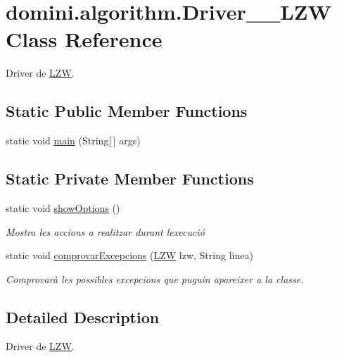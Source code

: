 \hypertarget{classdomini_1_1algorithm_1_1Driver____LZW}{}\section{domini.\+algorithm.\+Driver\+\_\+\+\_\+\+L\+ZW Class Reference}
\label{classdomini_1_1algorithm_1_1Driver____LZW}


Driver de \hyperlink{classdomini_1_1algorithm_1_1LZW}{L\+ZW}.  


\subsection*{Static Public Member Functions}
\begin{DoxyCompactItemize}
\item 
static void \hyperlink{classdomini_1_1algorithm_1_1Driver____LZW_a1500b5c33b09cbaad4645f6d87eecc4c}{main} (String\mbox{[}$\,$\mbox{]} args)
\end{DoxyCompactItemize}
\subsection*{Static Private Member Functions}
\begin{DoxyCompactItemize}
\item 
static void \hyperlink{classdomini_1_1algorithm_1_1Driver____LZW_ad43ebe1afd0d4e5be51584c71a1789d2}{show\+Options} ()
\begin{DoxyCompactList}\small\item\em Mostra les accions a realitzar durant l\textquotesingle{}execució \end{DoxyCompactList}\item 
static void \hyperlink{classdomini_1_1algorithm_1_1Driver____LZW_a3f609a2c3a22d0c7d11a5ff4e015e433}{comprovar\+Excepcions} (\hyperlink{classdomini_1_1algorithm_1_1LZW}{L\+ZW} lzw, String linea)
\begin{DoxyCompactList}\small\item\em Comprovarà les possibles excepcions que puguin apareixer a la classe. \end{DoxyCompactList}\end{DoxyCompactItemize}


\subsection{Detailed Description}
Driver de \hyperlink{classdomini_1_1algorithm_1_1LZW}{L\+ZW}. 

